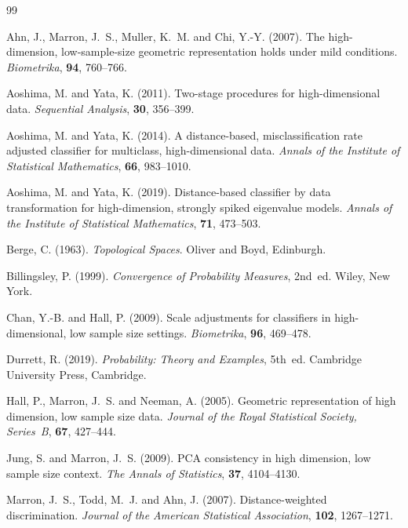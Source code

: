 \documentclass[11pt,a4paper]{amsart}
\numberwithin{equation}{section}
\theoremstyle{definition}
\theoremstyle{remark}
\begin{document}
\begin{thebibliography}{99}

Ahn, J., Marron, J.~S., Muller, K.~M. and Chi, Y.-Y. (2007).
The high-dimension, low-sample-size geometric representation holds under mild conditions.
\textit{Biometrika}, \textbf{94}, 760--766.

Aoshima, M. and Yata, K. (2011).
Two-stage procedures for high-dimensional data.
\textit{Sequential Analysis}, \textbf{30}, 356--399.

Aoshima, M. and Yata, K. (2014).
A distance-based, misclassification rate adjusted classifier for multiclass, high-dimensional data.
\textit{Annals of the Institute of Statistical Mathematics}, \textbf{66}, 983--1010.

Aoshima, M. and Yata, K. (2019).
Distance-based classifier by data transformation for high-dimension, strongly spiked eigenvalue models.
\textit{Annals of the Institute of Statistical Mathematics}, \textbf{71}, 473--503.

Berge, C. (1963).
\textit{Topological Spaces}.
Oliver and Boyd, Edinburgh.

Billingsley, P. (1999).
\textit{Convergence of Probability Measures}, 2nd~ed.
Wiley, New York.

Chan, Y.-B. and Hall, P. (2009).
Scale adjustments for classifiers in high-dimensional, low sample size settings.
\textit{Biometrika}, \textbf{96}, 469--478.

Durrett, R. (2019).
\textit{Probability: Theory and Examples}, 5th~ed.
Cambridge University Press, Cambridge.

Hall, P., Marron, J.~S. and Neeman, A. (2005).
Geometric representation of high dimension, low sample size data.
\textit{Journal of the Royal Statistical Society, Series~B}, \textbf{67}, 427--444.

Jung, S. and Marron, J.~S. (2009).
PCA consistency in high dimension, low sample size context.
\textit{The Annals of Statistics}, \textbf{37}, 4104--4130.

Marron, J.~S., Todd, M.~J. and Ahn, J. (2007).
Distance-weighted discrimination.
\textit{Journal of the American Statistical Association}, \textbf{102}, 1267--1271.


\end{thebibliography}
\end{document}
